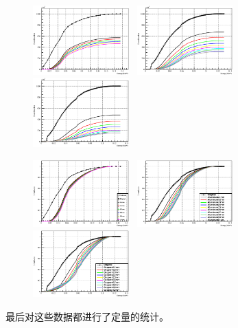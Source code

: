 \documentclass{beamer}
\newcommand{\liuhao}{\fontsize{7.875pt}{\baselineskip}\selectfont}
\begin{document}
\begin{CJK*}{UTF8}{gkai}
\begin{frame}
\begin{figure}[ht]
      \includegraphics[width=0.33\textwidth]{200keVElectronXrayTiDistribution.eps}~
      \includegraphics[width=0.33\textwidth]{AluminumDistribution.eps}~
      \includegraphics[width=0.33\textwidth]{CopperDistribution.eps}
      
      \includegraphics[width=0.33\textwidth]{180keVElectronXrayTiDistributionRatio.eps}~
      \includegraphics[width=0.33\textwidth]{AluminumDistributionRatio.eps}~
      \includegraphics[width=0.33\textwidth]{CopperDistributionRatio.eps}
    \end{figure}
    \vskip -0.3cm
    \liuhao
    最后对这些数据都进行了定量的统计。
  \end{frame}

\end{CJK*}
\end{document}
